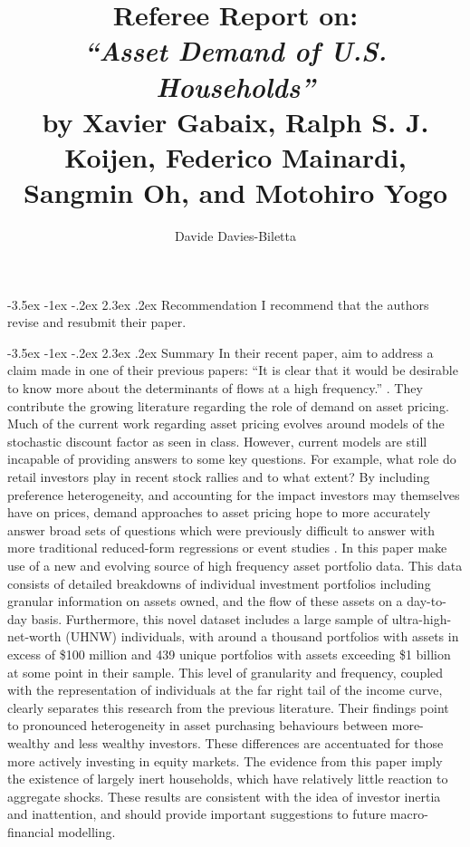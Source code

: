 \documentclass[]{article}
\title{Referee Report on:\\
	 \textit{``Asset Demand of U.S. Households''}\\
	 \bb
	  \large{by Xavier Gabaix, Ralph S. J. Koijen, Federico Mainardi, Sangmin Oh, and Motohiro Yogo}}
\author{Davide Davies-Biletta}
\makeatletter
\renewcommand\section{\leftskip 0pt\@startsection {section}{1}{\z@}%
	{-3.5ex \@plus -1ex \@minus -.2ex}%
	{2.3ex \@plus.2ex}%
	{\normalfont\Large\bfseries}}
\makeatother
\begin{document}
\vspace{50ex}

\maketitle
\thispagestyle{empty}
\pagebreak
{}
\begin{spacing}{1.25}
\section{Recommendation}
I recommend that the authors revise and resubmit their paper.

\section{Summary}
In their recent paper, \cite{gabaix2024asset} aim to address a claim made in one of their previous papers: ``It is clear that it would be desirable to know more about the determinants of flows at a high frequency.'' \parencite{gabaix2021search}. They contribute the growing literature regarding the role of demand on asset pricing. Much of the current work regarding asset pricing evolves around models of the stochastic discount factor as seen in class. However, current models are still incapable of providing answers to some key questions. For example, what role do retail investors play in recent stock rallies and to what extent? By including preference heterogeneity, and accounting for the impact investors may themselves have on prices, demand approaches to asset pricing hope to more accurately answer broad sets of questions which were previously difficult to answer with more traditional reduced-form regressions or event studies \parencite{koijen2019demand}. In this paper \cite{gabaix2024asset} make use of a new and evolving source of high frequency asset portfolio data. This data consists of detailed breakdowns of individual investment portfolios including granular information on assets owned, and the flow of these assets on a day-to-day basis. Furthermore, this novel dataset includes a large sample of ultra-high-net-worth (UHNW) individuals, with around a thousand portfolios with assets in excess of \$100 million and 439 unique portfolios with assets exceeding \$1 billion at some point in their sample. This level of granularity and frequency, coupled with the representation of individuals at the far right tail of the income curve, clearly separates this research from the previous literature.  
Their findings point to pronounced heterogeneity in asset purchasing behaviours between more-wealthy and less wealthy investors. These differences are accentuated for those more actively investing in equity markets. The evidence from this paper imply the existence of largely inert households, which have relatively little reaction to aggregate shocks. These results are consistent with the idea of investor inertia and inattention, and should provide important suggestions to future macro-financial modelling. 



\end{spacing}
\end{document}
